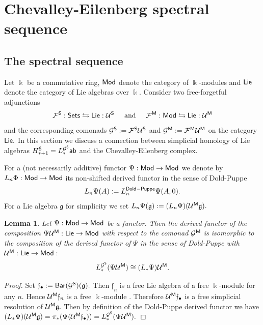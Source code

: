\documentclass{amsart}
\numberwithin{equation}{section}
\newtheorem{lemma}[theorem]{Lemma}
\theoremstyle{definition}
\def\FF{\mathcal{F}}
\def\GG{\mathcal{G}}
\def\UU{\mathcal{U}}
\def\gg{\mathfrak{g}}
\def\ff{\mathfrak{f}}
\def\kk{\Bbbk}
\begin{document}
 
 \section{Chevalley-Eilenberg spectral sequence} 
 
\subsection{The spectral sequence}

Let  $\kk$ be a commutative ring, ${\sf Mod}$ denote the category of $\kk$-modules and ${\sf Lie}$ denote the category of Lie algebras over $\kk$. Consider two free-forgetful adjunctions $$\FF^{\sf S}:{\sf Sets} \leftrightarrows {\sf Lie}:  \UU^{\sf S} \hspace{0.5cm} \text{and} \hspace{0.5cm} \FF^{\sf M}:{\sf Mod} \leftrightarrows {\sf Lie}:  \UU^{\sf M}$$
and the corresponding comonads $\GG^{\sf S}:=\FF^{\sf S}\UU^{\sf S}$ and $\GG^{\sf M}:=\FF^{\sf M}\UU^{\sf M}$ on the category ${\sf Lie}.$ 
In this section we discuss a connection between simplicial homology of Lie algebras  $H_{*+1}^{\sf S}=L_*^{\GG^{\sf S}}{\sf ab}$ and the Chevalley-Eilenberg complex. 

 For a (not necessarily  additive) functor $\Psi:{\sf Mod}\to {\sf Mod}$ we denote by $L_n\Phi:{\sf Mod}\to {\sf Mod}$ its non-shifted derived functor in the sense of Dold-Puppe \cite{dold1961homologie}
$$L_n\Psi (A) := L^{\sf Dold-Puppe}_n\Psi (A,0).$$ 
For a Lie algebra $\gg$ for simplicity we set $L_n\Psi (\gg):=(L_n\Psi)( \UU^{\sf M}\gg).$  

\begin{lemma}\label{lemma_derived_DP}
Let $\Psi:{\sf Mod}\to {\sf Mod}$  be a functor. Then the derived functor of the composition $\Psi \UU^{\sf M}: {\sf Lie}\to {\sf Mod}$ with respect to the comonad $\GG^{\sf M}$ is isomorphic to the composition of the derived functor of $\Psi$ in the sense of Dold-Puppe with $\UU^{\sf M}:{\sf Lie}\to {\sf Mod}:$
$$L^{\GG^{\sf S}}_* (\Psi \UU^{\sf M} ) \cong  (L_*\Psi) \UU^{\sf M}.$$
\end{lemma}
\begin{proof}
Set $\ff_\bullet:={\sf Bar}(\GG^{\sf S})(\gg).$ Then $\ff_n$ is a free Lie algebra of a free $\kk$-module  for any $n.$ 
Hence  $\UU^{\sf M} \ff_n $ is a free $\kk$-module \cite[Cor.0.10]{reutenauer2003free}. Therefore $\UU^{\sf M}\ff_\bullet$ is a free simplicial resolution of $\UU^{\sf M} \gg.$ 
Then by definition of the Dold-Puppe derived functor we have $(L_*\Psi)(\UU^{\sf M}\gg)=  \pi_*(\Psi (\UU^{\sf M} \ff_\bullet))=  L^{\GG^{\sf S}}_* (\Psi \UU^{\sf M} ).$
\end{proof}
\end{document}
